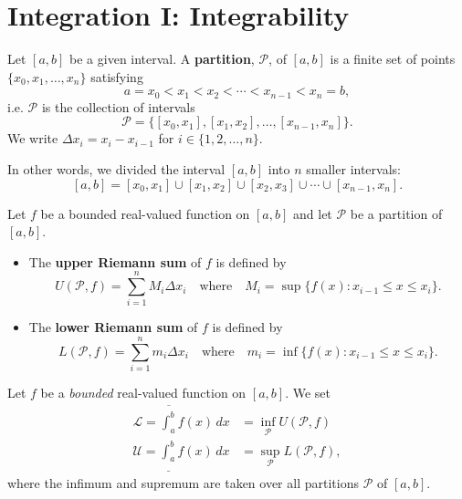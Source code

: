 \documentclass[12pt, a4paper]{article}
\begin{document}
\section{Integration I: Integrability}

\begin{definition}
    Let \([a,b]\) be a given interval. A \textbf{partition}, \(\mathcal{P}\), of \([a,b]\) is a finite set of points \(\{x_0,x_1,\ldots,x_n\}\) satisfying
    \[a=x_0<x_1<x_2<\cdots<x_{n-1}<x_n=b,\]
    i.e. \(\mathcal{P}\) is the collection of intervals
    \[\mathcal{P}=\{[x_0,x_1], [x_1,x_2],\ldots,[x_{n-1},x_n]\}.\]
    We write \(\Delta x_i=x_i-x_{i-1}\) for \(i \in \{1,2,\ldots, n\}\).
\end{definition}

\begin{mdnote}
    In other words, we divided the interval \([a,b]\) into \(n\) smaller intervals:
    \[[a,b]=[x_0,x_1] \cup [x_1,x_2]\cup [x_2,x_3]\cup \cdots \cup [x_{n-1},x_n].\]
\end{mdnote}

\begin{definition}
    Let \(f\) be a bounded real-valued function on \([a,b]\) and let \(\mathcal{P}\) be a partition of \([a,b]\).
    \begin{itemize}
        \item The \textbf{upper Riemann sum} of \(f\) is defined by
        \[U(\mathcal{P},f)=\sum_{i=1}^n M_i\Delta x_i \quad \text{where} \quad  M_i=\sup\{f(x) : x_{i-1} \leq x \leq x_i\}.\]
        \item The \textbf{lower Riemann sum} of \(f\) is defined by
            \[L(\mathcal{P},f)=\sum_{i=1}^n m_i\Delta x_i \quad \text{where} \quad m_i=\inf\{f(x) : x_{i-1} \leq x \leq x_i\}.\]
    \end{itemize}
\end{definition}

\begin{definition}
    Let \(f\) be a \textit{bounded} real-valued function on \([a,b]\). We set
    \[\begin{aligned}
        \mathcal{L}=\overline{\int_a^b} f(x) \, dx&=\inf_\mathcal{P} U(\mathcal{P},f) \\
        \mathcal{U}=\underline{\int_a^b} f(x) \, dx&=\sup_\mathcal{P} L(\mathcal{P},f),
    \end{aligned}\]
    where the infimum and supremum are taken over all partitions \(\mathcal{P}\) of \([a,b]\).
\end{definition}
\end{document}
